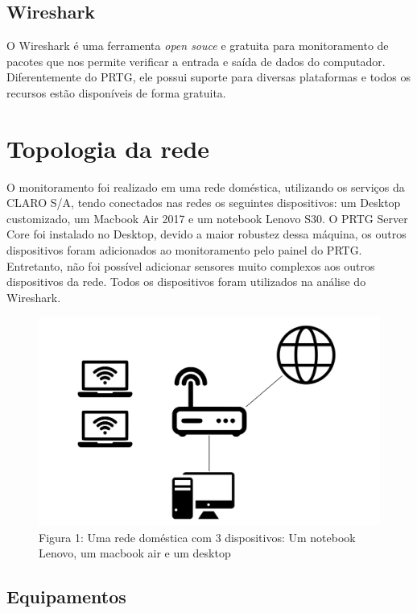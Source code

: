 \documentclass[12pt]{article}
\begin{document}
\subsection{Wireshark}

O Wireshark é uma ferramenta \emph{open souce} e gratuita para monitoramento de pacotes que nos permite verificar a entrada e saída de dados do computador. Diferentemente do PRTG, ele possui suporte para diversas plataformas e todos os recursos estão disponíveis de forma gratuita.

\section{Topologia da rede}

O monitoramento foi realizado em uma rede doméstica, utilizando os serviços da CLARO S/A, tendo conectados nas redes os seguintes dispositivos: um Desktop customizado, um Macbook Air 2017 e um notebook Lenovo S30. O PRTG Server Core foi instalado no Desktop, devido a maior robustez dessa máquina, os outros dispositivos foram adicionados ao monitoramento pelo painel do PRTG. Entretanto, não foi possível adicionar sensores muito complexos aos outros dispositivos da rede. Todos os dispositivos foram utilizados na análise do Wireshark.

\begin{figure}
    \includegraphics[width=\linewidth]{topology.png}
    \caption{Figura 1: Uma rede doméstica com 3 dispositivos: Um notebook Lenovo, um macbook air e um desktop}
\end{figure}

\subsection{Equipamentos}
\end{document}
